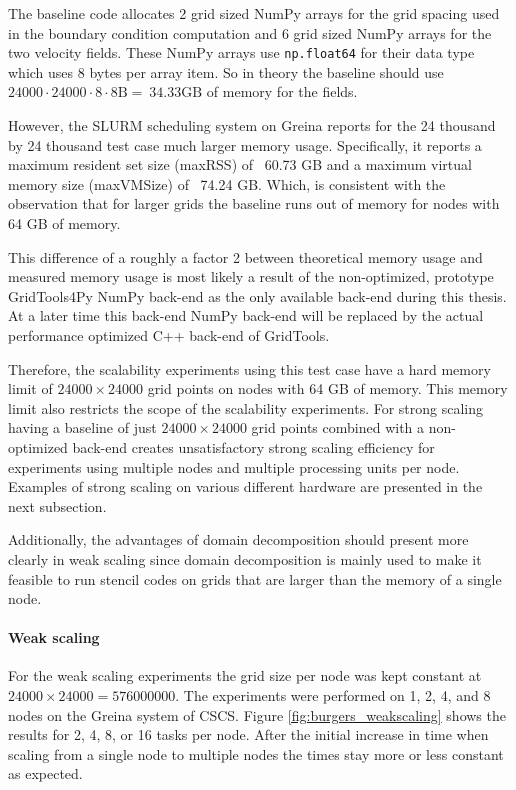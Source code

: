 The baseline code allocates 2 grid sized NumPy arrays for the grid spacing used in the boundary condition computation and 6 grid sized NumPy arrays for the two velocity fields.
These NumPy arrays use \texttt{np.float64} for their data type which uses 8 bytes per array item.
So in theory the baseline should use $24000 \cdot 24000 \cdot 8 \cdot 8 \text{B} = ~34.33 \text{GB}$ of memory for the fields.

However, the SLURM scheduling system on Greina reports for the 24 thousand by 24 thousand test case much larger memory usage.
Specifically, it reports a maximum resident set size (maxRSS) of ~60.73 GB and a maximum virtual memory size (maxVMSize) of ~74.24 GB.
Which, is consistent with the observation that for larger grids the baseline runs out of memory for nodes with 64 GB of memory.

This difference of a roughly a factor 2 between theoretical memory usage and measured memory usage is most likely a result of the non-optimized, prototype GridTools4Py NumPy back-end as the only available back-end during this thesis.
At a later time this back-end NumPy back-end will be replaced by the actual performance optimized C++ back-end of GridTools.

Therefore, the scalability experiments using this test case have a hard memory limit of $24000 \times 24000$ grid points on nodes with 64 GB of memory.
This memory limit also restricts the scope of the scalability experiments.
For strong scaling having a baseline of just $24000 \times 24000$ grid points combined with a non-optimized back-end creates unsatisfactory strong scaling efficiency for experiments using multiple nodes and multiple processing units per node.
Examples of strong scaling on various different hardware are presented in the next subsection.

Additionally, the advantages of domain decomposition should present more clearly in weak scaling since domain decomposition is mainly used to make it feasible to run stencil codes on grids that are larger than the memory of a single node.

\paragraph{Weak scaling}
For the weak scaling experiments the grid size per node was kept constant at $24000 \times 24000 = 576000000$.
The experiments were performed on 1, 2, 4, and 8 nodes on the Greina system of CSCS.
Figure \ref{fig:burgers_weakscaling} shows the results for 2, 4, 8, or 16 tasks per node.
After the initial increase in time when scaling from a single node to multiple nodes the times stay more or less constant as expected.

